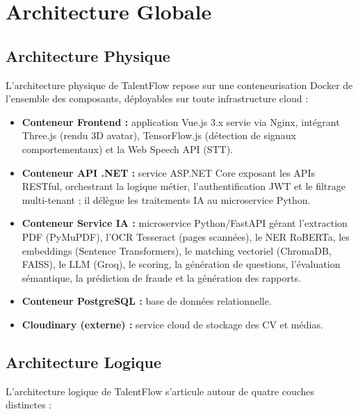 \section{Architecture Globale}

\subsection{Architecture Physique}

L'architecture physique de TalentFlow repose sur une conteneurisation Docker de
l'ensemble des composants, déployables sur toute infrastructure cloud :

\begin{itemize}
    \item \textbf{Conteneur Frontend :} application Vue.js 3.x servie via Nginx,
    intégrant Three.js (rendu 3D avatar), TensorFlow.js (détection de signaux
    comportementaux) et la Web Speech API (STT).

    \item \textbf{Conteneur API .NET :} service ASP.NET Core exposant les APIs RESTful,
    orchestrant la logique métier, l'authentification JWT et le filtrage multi-tenant ;
    il délègue les traitements IA au microservice Python.

    \item \textbf{Conteneur Service IA :} microservice Python/FastAPI gérant l'extraction
    PDF (PyMuPDF), l'OCR Tesseract (pages scannées), le NER RoBERTa, les embeddings
    (Sentence Transformers), le matching vectoriel (ChromaDB, FAISS), le LLM (Groq),
    le scoring, la génération de questions, l'évaluation sémantique, la prédiction de
    fraude et la génération des rapports.

    \item \textbf{Conteneur PostgreSQL :} base de données relationnelle.

    \item \textbf{Cloudinary (externe) :} service cloud de stockage des CV et médias.
\end{itemize}

\subsection{Architecture Logique}

L'architecture logique de TalentFlow s'articule autour de quatre couches distinctes :

